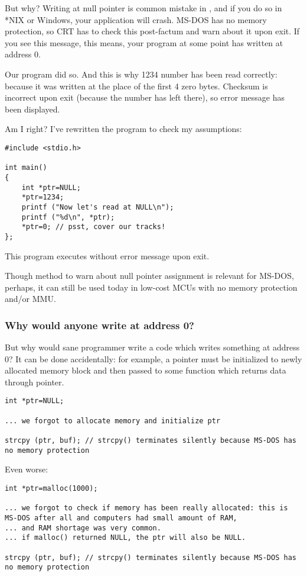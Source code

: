 But why? Writing at null pointer is common mistake in \CCpp, and if you do so in *NIX or Windows, your application will crash.
MS-DOS has no memory protection, so \ac{CRT} has to check this post-factum and warn about it upon exit.
If you see this message, this means, your program at some point has written at address 0.

Our program did so. And this is why 1234 number has been read correctly: because it was written at the place of the first 4 zero bytes.
Checksum is incorrect upon exit (because the number has left there), so error message has been displayed.

Am I right?
I've rewritten the program to check my assumptions:

\begin{lstlisting}[style=customc]
#include <stdio.h>

int main()
{
	int *ptr=NULL;
	*ptr=1234;
	printf ("Now let's read at NULL\n");
	printf ("%d\n", *ptr);
	*ptr=0; // psst, cover our tracks!
};
\end{lstlisting}

This program executes without error message upon exit.

Though method to warn about null pointer assignment is relevant for MS-DOS,
perhaps, it can still be used today in low-cost \ac{MCU}s with no memory protection and/or \ac{MMU}.

\subsubsection{Why would anyone write at address 0?}

But why would sane programmer write a code which writes something at address 0?
It can be done accidentally: for example, a pointer must be initialized to newly allocated memory block and then passed to some function which returns data through pointer.

\begin{lstlisting}[style=customc]
int *ptr=NULL;

... we forgot to allocate memory and initialize ptr

strcpy (ptr, buf); // strcpy() terminates silently because MS-DOS has no memory protection
\end{lstlisting}

Even worse:

\begin{lstlisting}[style=customc]
int *ptr=malloc(1000);

... we forgot to check if memory has been really allocated: this is MS-DOS after all and computers had small amount of RAM,
... and RAM shortage was very common.
... if malloc() returned NULL, the ptr will also be NULL.

strcpy (ptr, buf); // strcpy() terminates silently because MS-DOS has no memory protection
\end{lstlisting}


